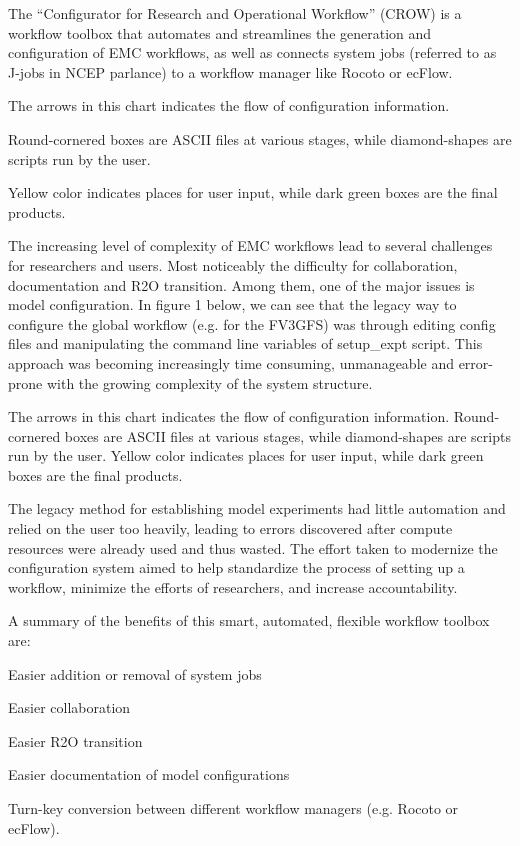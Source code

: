 The “\-Configurator for Research and Operational Workflow” (C\-R\-O\-W) is a workflow toolbox that automates and streamlines the generation and configuration of E\-M\-C workflows, as well as connects system jobs (referred to as J-\/jobs in N\-C\-E\-P parlance) to a workflow manager like Rocoto or ec\-Flow.


\begin{DoxyItemize}
\item The arrows in this chart indicates the flow of configuration information.
\item Round-\/cornered boxes are A\-S\-C\-I\-I files at various stages, while diamond-\/shapes are scripts run by the user.
\item Yellow color indicates places for user input, while dark green boxes are the final products.
\end{DoxyItemize}

The increasing level of complexity of E\-M\-C workflows lead to several challenges for researchers and users. Most noticeably the difficulty for collaboration, documentation and R2\-O transition. Among them, one of the major issues is model configuration. In figure 1 below, we can see that the legacy way to configure the global workflow (e.\-g. for the F\-V3\-G\-F\-S) was through editing config files and manipulating the command line variables of setup\-\_\-expt script. This approach was becoming increasingly time consuming, unmanageable and error-\/prone with the growing complexity of the system structure.



The arrows in this chart indicates the flow of configuration information. Round-\/cornered boxes are A\-S\-C\-I\-I files at various stages, while diamond-\/shapes are scripts run by the user. Yellow color indicates places for user input, while dark green boxes are the final products.

The legacy method for establishing model experiments had little automation and relied on the user too heavily, leading to errors discovered after compute resources were already used and thus wasted. The effort taken to modernize the configuration system aimed to help standardize the process of setting up a workflow, minimize the efforts of researchers, and increase accountability.

A summary of the benefits of this smart, automated, flexible workflow toolbox are\-:


\begin{DoxyItemize}
\item Easier addition or removal of system jobs
\item Easier collaboration
\item Easier R2\-O transition
\item Easier documentation of model configurations
\item Turn-\/key conversion between different workflow managers (e.\-g. Rocoto or ec\-Flow).
\end{DoxyItemize}


